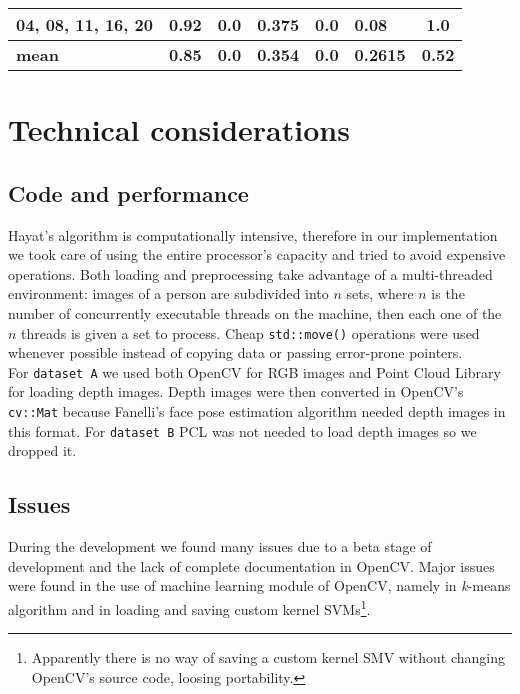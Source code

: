 \documentclass{article}
\begin{document}
\begin{table}[]
\begin{adjustwidth}{-.75in}{-.75in}
\begin{tabular}{|l|l|c|l|c|l|c|}
			04, 08, 11, 16, 20               & 0.92       & 0.0                       & 0.375      & 0.0                         & 0.08       & 1.0\\ \hline

			\bf mean                         & \bf 0.85   & \bf 0.0                   & \bf 0.354 & \bf 0.0                     & \bf 0.2615   & \bf 0.52\\ \hline
		\end{tabular}
	\end{adjustwidth}
\end{table}


\section{Technical considerations}
	
	\subsection{Code and performance}
	Hayat's algorithm is computationally intensive, therefore in our implementation we took care of using the entire processor's capacity and tried to avoid expensive operations. Both loading and preprocessing take advantage of a multi-threaded environment: images of a person are subdivided into $n$ sets, where $n$ is the number of concurrently executable threads on the machine, then each one of the $n$ threads is given a set to process. Cheap \verb|std::move()| operations were used whenever possible instead of copying data or passing error-prone pointers. \\
	For \verb|dataset A| we used both OpenCV for RGB images and Point Cloud Library for loading depth images. Depth images were then converted in OpenCV's \verb|cv::Mat| because Fanelli's face pose estimation algorithm needed depth images in this format. For \verb|dataset B| PCL was not needed to load depth images so we dropped it. \\
	
	\subsection{Issues}
	During the development we found many issues due to a beta stage of development  and the lack of complete documentation in OpenCV. Major issues were found in the use of machine learning module of OpenCV, namely in \textit{k}-means algorithm and in loading and saving custom kernel SVMs\footnote{Apparently there is no way of saving a custom kernel SMV without changing OpenCV's source code, loosing portability.}.


\printbibliography
\end{document}
